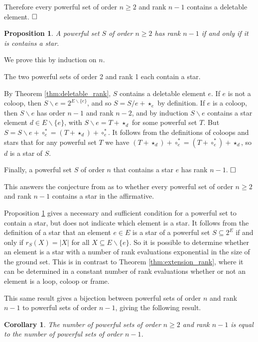 \documentclass[10pt]{article}
\newtheorem{cor}[thm]{Corollary}
\newtheorem{pro}[thm]{Proposition}
\theoremstyle{definition}
\def\pf{\noindent {\it Proof.\ }}
\begin{document}
 
 Therefore every powerful set of order $n\geq 2$ and rank $n-1$ contains a deletable element. $\hfill\Box$
\\
 
\begin{pro} \label{pro:frame_existance}
	A powerful set $S$ of order $n\geq 2$ has rank $n-1$ if and only if it is contains a star.
\end{pro} 
\pf We prove this by induction on $n$.

The two powerful sets of order 2 and rank 1 each contain a star.


By Theorem \ref{thm:deletable_rank}, $S$ contains a deletable element $e$. If $e$ is not a coloop, then $S\backslash{e}=2^{E\backslash\{e\}}$, and so $S=S/e+\star_e$ by definition. If $e$ is a coloop, then $S\backslash{ e}$ has order $n-1$ and rank $n-2$, and by induction $S\backslash{e}$ contains a star element $d\in E\backslash\{e\}$, with $S\backslash{e}=T+\star_d$ for some powerful set $T$. But $S=S\backslash{ e}+\circ_e^*=(T+\star_d)+\circ_e^*$. It follows from the definitions of coloops and stars that for any powerful set $T$ we have $(T+\star_d)+\circ_e^*=(T+\circ_e^*)+\star_d$, so $d$ is a star of $S$. 

Finally, a powerful set $S$ of order $n$ that contains a star $e$ has rank $n-1$. $\hfill\Box$


This answers the conjecture from \cite{farr2017} as to whether every powerful set of order $n\geq 2$ and rank $n-1$ contains a star in the affirmative.



Proposition \ref{pro:frame_existance} gives a necessary and sufficient condition for a powerful set to contain a star, but does not indicate which element is a star. It follows from the definition of a star that an element $e\in E$ is a star of a powerful set $S\subseteq 2^E$ if and only if $r_S(X)=|X|$ for all $X\subseteq E\backslash\{e\}$. So it is possible to determine whether an element is a star with a number of rank evaluations exponential in the size of the ground set.  This is in contrast to Theorem \ref{thm:extension_rank}, where it can be determined in a constant number of rank evaluations whether or not an element is a loop, coloop or frame.


This same result gives a bijection between powerful sets of order $n$ and rank $n-1$ to powerful sets of order $n-1$, giving the following result.
\begin{cor}
 	The number of powerful sets of order $n\geq 2$ and rank $n-1$ is equal to the number of powerful sets of order $n-1$.
 \end{cor}
\end{document}
